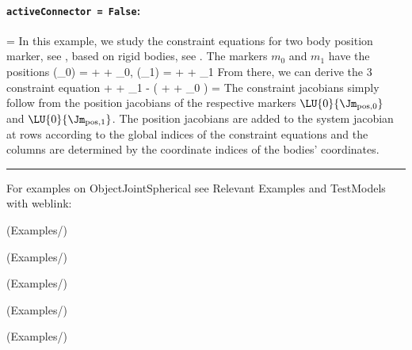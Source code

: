     \paragraph{\texttt{activeConnector = False}:}
    \be
      \zv = \Null
    \ee
    In this example, we study the constraint equations for two body position marker, see ,
    based on rigid bodies, see . 
    The markers $m_0$ and $m_1$ have the positions
    \be
      (\pLocB_0) =  +  + \pLocB_0, \quad
      (\pLocB_1) =  +  + \pLocB_1 \eqDot
    \ee
    From there, we can derive the 3 constraint equation
    \be
             +  + \pLocB_1 - 
      \left( +  + \pLocB_0 \right) = \Null \eqDot
    \ee
    The constraint jacobians simply follow from the position jacobians of the respective markers $\LU{0}{\Jm_\mathrm{pos,0}}$
    and  $\LU{0}{\Jm_\mathrm{pos,1}}$. 
    The position jacobians are added to the system jacobian at rows according to the global indices of the constraint equations
    and the columns are determined by the coordinate indices of the bodies' coordinates.
\vspace{6pt}\par\noindent\rule{\textwidth}{0.4pt}
%
\noindent For examples on ObjectJointSpherical see Relevant Examples and TestModels with weblink:
\bi
\item {} (Examples/)
\item {} (Examples/)
\item {} (Examples/)
\item {} (Examples/)
\item {} (Examples/)
